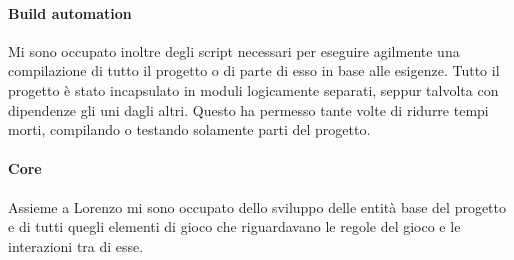 \paragraph{Build automation}
Mi sono occupato inoltre degli script necessari per eseguire agilmente una compilazione di tutto il progetto o di parte di esso in base alle esigenze.
Tutto il progetto è stato incapsulato in moduli logicamente separati, seppur talvolta con dipendenze gli uni dagli altri.
Questo ha permesso tante volte di ridurre tempi morti, compilando o testando solamente parti del progetto.

\paragraph{Core}
Assieme a Lorenzo mi sono occupato dello sviluppo delle entità base del progetto e di tutti quegli elementi di gioco che riguardavano le regole del gioco e le interazioni tra di esse.

\newpage